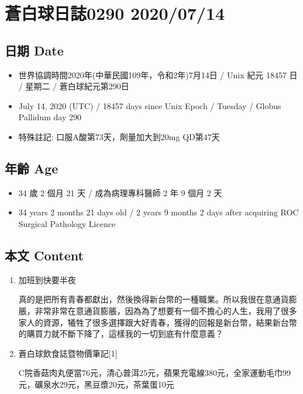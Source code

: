 \documentclass[a5paper, 11pt
]{book}
\providecommand{\tightlist}{%
  \setlength{\itemsep}{0pt}\setlength{\parskip}{0pt}}
\begin{document}
\hypertarget{ux84bcux767dux7403ux65e5ux8a8c0290-20200714}{%
\section{蒼白球日誌0290
2020/07/14}\label{ux84bcux767dux7403ux65e5ux8a8c0290-20200714}}

\hypertarget{ux65e5ux671f-date-43}{%
\subsection{日期 Date}\label{ux65e5ux671f-date-43}}

\begin{itemize}
\tightlist
\item
  世界協調時間2020年(中華民國109年，令和2年)7月14日 / Unix 紀元 18457 日
  / 星期二 / 蒼白球紀元第290日
\item
  July 14, 2020 (UTC) / 18457 days since Unix Epoch / Tuesday / Globus
  Pallidum day 290
\item
  特殊註記: 口服A酸第73天，劑量加大到20mg QD第47天
\end{itemize}

\hypertarget{ux5e74ux9f61-age-43}{%
\subsection{年齡 Age}\label{ux5e74ux9f61-age-43}}

\begin{itemize}
\tightlist
\item
  34 歲 2 個月 21 天 / 成為病理專科醫師 2 年 9 個月 2 天
\item
  34 years 2 months 21 days old / 2 years 9 months 2 days after
  acquiring ROC Surgical Pathology Licence
\end{itemize}

\hypertarget{ux672cux6587-content-43}{%
\subsection{本文 Content}\label{ux672cux6587-content-43}}

\begin{enumerate}
\def\labelenumi{\arabic{enumi}.}
\item
  加班到快要半夜

  真的是把所有青春都獻出，然後換得新台幣的一種職業。所以我很在意通貨膨脹，非常非常在意通貨膨脹，因為為了想要有一個不擔心的人生，我用了很多家人的資源，犧牲了很多選擇跟大好青春，獲得的回報是新台幣，結果新台幣的購買力就不斷下降了，這樣我的一切到底有什麼意義？
\item
  蒼白球飲食誌暨物價筆記{[}1{]}

  C院香菇肉丸便當76元，清心普洱25元，蘋果充電線380元，全家運動毛巾99元，礦泉水29元，黑豆漿20元，茶葉蛋10元
\end{enumerate}
\end{document}
